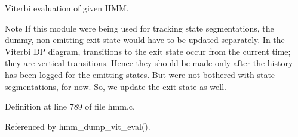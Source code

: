 Viterbi evaluation of given H\+M\+M. 

\begin{DoxyNote}{Note}
If this module were being used for tracking state segmentations, the dummy, non-\/emitting exit state would have to be updated separately. In the Viterbi D\+P diagram, transitions to the exit state occur from the current time; they are vertical transitions. Hence they should be made only after the history has been logged for the emitting states. But we\textquotesingle{}re not bothered with state segmentations, for now. So, we update the exit state as well. 
\end{DoxyNote}


Definition at line 789 of file hmm.\+c.



Referenced by hmm\+\_\+dump\+\_\+vit\+\_\+eval().

